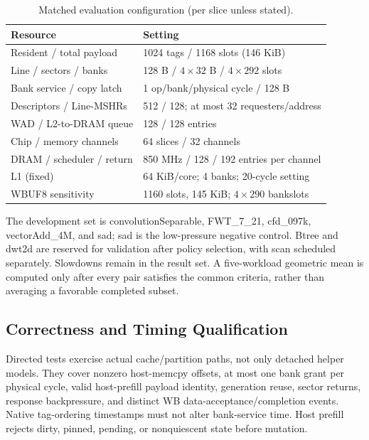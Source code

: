 \documentclass[conference,letterpaper]{IEEEtran}
\begin{document}
\begin{table}[t]
\caption{Matched evaluation configuration (per slice unless stated).}
\label{tab:configuration}\centering\footnotesize
\begin{tabularx}{\columnwidth}{@{}L{.42\columnwidth}X@{}}
\toprule
Resource & Setting \\
\midrule
Resident / total payload & 1024 tags / 1168 slots (146 KiB) \\
Line / sectors / banks & 128 B / $4\times32$ B / $4\times292$ slots \\
Bank service / copy latch & 1 op/bank/physical cycle / 128 B \\
Descriptors / Line-MSHRs & 512 / 128; at most 32 requesters/address \\
WAD / L2-to-DRAM queue & 128 / 128 entries \\
Chip / memory channels & 64 slices / 32 channels \\
DRAM / scheduler / return & 850 MHz / 128 / 192 entries per channel \\
L1 (fixed) & 64 KiB/core; 4 banks; 20-cycle setting \\
WBUF8 sensitivity & 1160 slots, 145 KiB; $4\times290$ bankslots \\
\bottomrule
\end{tabularx}
\end{table}

The development set is convolutionSeparable, FWT\_7\_21, cfd\_097k, vectorAdd\_4M, and sad; sad is the low-pressure negative control. Btree and dwt2d are reserved for validation after policy selection, with scan scheduled separately. Slowdowns remain in the result set. A five-workload geometric mean is computed only after every pair satisfies the common criteria, rather than averaging a favorable completed subset.

\subsection{Correctness and Timing Qualification}
Directed tests exercise actual cache/partition paths, not only detached helper models. They cover nonzero host-memcpy offsets, at most one bank grant per physical cycle, valid host-prefill payload identity, generation reuse, sector returns, response backpressure, and distinct WB data-acceptance/completion events. Native tag-ordering timestamps must not alter bank-service time. Host prefill rejects dirty, pinned, pending, or nonquiescent state before mutation.
\end{document}
